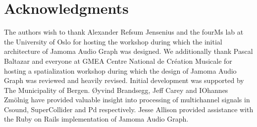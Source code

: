 \documentclass[twoside,a4paper]{article}
\begin{document}




%
\section{Acknowledgments} %
%

The authors wish to thank Alexander Refsum Jensenius and the fourMs lab at the University of Oslo for hosting the workshop during which the initial architecture of Jamoma Audio Graph was designed. %
We additionally thank Pascal Baltazar and everyone at GMEA Centre National de Cr\' eation Musicale for hosting a spatialization workshop during which the design of Jamoma Audio Graph was reviewed and heavily revised. %
Initial development was supported by The Municipality of Bergen.  
\O yvind Brandsegg, Jeff Carey and IOhannes Zm\"olnig have provided valuable insight into processing of multichannel signals in Csound, SuperCollider and Pd respectively.
Jesse Allison provided assistance with the Ruby on Rails implementation of Jamoma Audio Graph.





\end{document}
